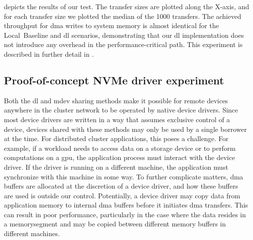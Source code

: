  depicts the results of our test.
%
The transfer sizes are plotted along the X-axis, and for each transfer size we plotted the median of the 1000 transfers.
%
The achieved throughput for \gls{dma} writes to system memory is almost identical for the Local~Baseline and \gls{dl} scenarios, demonstrating that our \gls{dl} implementation does not introduce any overhead in the performance-critical path.
%
This experiment is described in further detail in .



\subsection{Proof-of-concept NVMe driver experiment}\label{sec:eval-nvme}
Both the \gls{dl} and \gls{mdev} sharing methods make it possible for remote devices anywhere in the cluster network to be operated by native device drivers.
%
Since most device drivers are written in a way that assumes exclusive control of a device, devices shared with these methods may only be used by a single \gls{borrower} at the time.
%
For distributed cluster applications, this poses a challenge.
%
For example, if a workload needs to access data on a storage device or to perform computations on a \gls{gpu}, the application process must interact with the device driver.
%
If the driver is running on a different machine, the application must synchronize with this machine in some way.
%
To further complicate matters, \gls{dma} buffers are allocated at the discretion of a device driver, and how these buffers are used is outside our control.
%
Potentially, a device driver may copy data from application memory to internal \gls{dma} buffers before it initiates \gls{dma} transfers.
%
This can result in poor performance, particularly in the case where the data resides in a \gls{memorysegment} and may be copied between different memory buffers in different machines.



